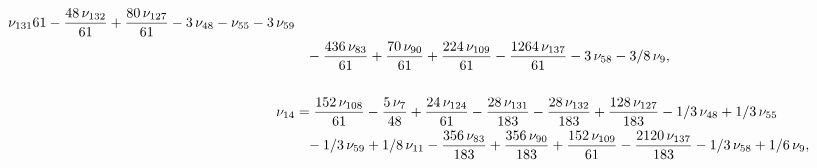 \documentclass[a4paper,12pt, DIV=14, BCOR=5mm, twoside, headsepline]{scrbook}
\begin{document}
\begin{align}
\begin{aligned}
{{\,\nu_{{131}}}{61}}-{\frac {48\,\nu_{{132}}}{61}}+{\frac {80\,\nu_{{
127}}}{61}}-3\,\nu_{{48}}-\nu_{{55}}-3\,\nu_{{59}}\\
 &\hphantom{=} -{\frac {436\,\nu_{{
83}}}{61}}+{\frac {70\,\nu_{{90}}}{61}}+{\frac {224\,\nu_{{109}}}{61}}
-{\frac {1264\,\nu_{{137}}}{61}}-3\,\nu_{{58}}-3/8\,\nu_{{9}}, \\
\\
\nu_{{14
}}&={\frac {152\,\nu_{{108}}}{61}}-{\frac {5\,\nu_{{7}}}{48}}+{\frac {
24\,\nu_{{124}}}{61}}-{\frac {28\,\nu_{{131}}}{183}}-{\frac {28\,\nu_{
{132}}}{183}}+{\frac {128\,\nu_{{127}}}{183}}-1/3\,\nu_{{48}}+1/3\,\nu
_{{55}}\\
 &\hphantom{=}-1/3\,\nu_{{59}}+1/8\,\nu_{{11}}-{\frac {356\,\nu_{{83}}}{183}}
+{\frac {356\,\nu_{{90}}}{183}}+{\frac {152\,\nu_{{109}}}{61}}-{\frac 
{2120\,\nu_{{137}}}{183}}-1/3\,\nu_{{58}}+1/6\,\nu_{{9}}, \\
\end{aligned}
\end{align}
\end{document}
